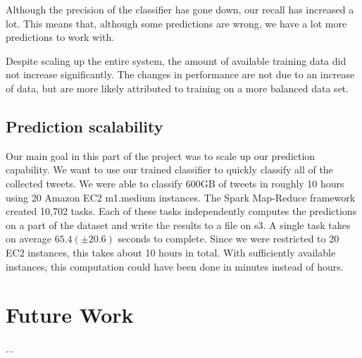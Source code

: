 \documentclass{llncs}
\begin{document}
Although the precision of the classifier has gone down, our recall has increased a lot. This means that, although some predictions are wrong, we have a lot more predictions to work with.

Despite scaling up the entire system, the amount of available training data did not increase significantly. The changes in performance are not due to an increase of data, but are more likely attributed to training on a more balanced data set.

\subsection{Prediction scalability}

Our main goal in this part of the project was to scale up our prediction capability. We want to use our trained classifier to quickly classify all of the collected tweets. We were able to classify 600GB of tweets in roughly 10 hours using 20 Amazon EC2 m1.medium instances. The Spark Map-Reduce framework created 10,702 tasks. Each of these tasks independently computes the predictions on a part of the dataset and write the results to a file on s3. A single task takes on average $65.4 (\pm 20.6)$ seconds to complete. Since we were restricted to 20 EC2 instances, this takes about 10 hours in total. With sufficiently available instances, this computation could have been done in minutes instead of hours.

\section{Future Work}
...






\end{document}
